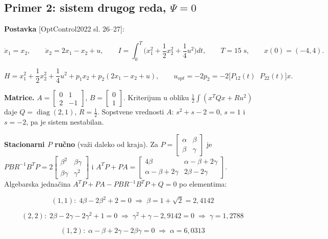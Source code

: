 \documentclass[11pt,a4paper,parskip=half,headsepline,numbers=noenddot]{scrartcl}
\DeclareRobustCommand{\izvor}[1]{{\small\color{izvorC}[#1]}}
\begin{document}
\subsection{\texorpdfstring{Primer 2: sistem drugog reda, \(\Psi = 0\)}{Primer 2: sistem drugog reda, \textbackslash Psi = 0}}

\textbf{Postavka} \izvor{OptControl2022 sl. 26--27}:

\[\dot x_1 = x_2, \qquad \dot x_2 = 2x_1 - x_2 + u, \qquad I = \int_0^T\Big(x_1^2 + \frac12x_2^2 + \frac14u^2\Big)dt, \qquad T = 15 \text{ s}, \qquad x(0) = (-4, 4) .\]

\[H = x_1^2 + \frac12x_2^2 + \frac14u^2 + p_1x_2 + p_2(2x_1 - x_2 + u), \qquad u_{opt} = -2p_2 = -2\big[P_{12}(t)\;\; P_{22}(t)\big]x .\]

\textbf{Matrice.} \(A = \begin{bmatrix} 0 & 1 \\ 2 & -1\end{bmatrix}\), \(B = \begin{bmatrix} 0 \\ 1\end{bmatrix}\). Kriterijum u obliku \(\frac12\int(x^TQx + Ru^2)\) daje \(Q = \operatorname{diag}(2, 1)\), \(R = \frac12\). Sopstvene vrednosti \(A\): \(s^2 + s - 2 = 0\), \(s = 1\) i \(s = -2\), pa je sistem nestabilan.

\textbf{Stacionarni \(P\) ručno} (važi daleko od kraja). Za \(P = \begin{bmatrix} \alpha & \beta \\ \beta & \gamma\end{bmatrix}\) je \(PBR^{-1}B^TP = 2\begin{bmatrix} \beta^2 & \beta\gamma \\ \beta\gamma & \gamma^2\end{bmatrix}\) i \(A^TP + PA = \begin{bmatrix} 4\beta & \alpha - \beta + 2\gamma \\ \alpha - \beta + 2\gamma & 2\beta - 2\gamma\end{bmatrix}\). Algebarska jednačina \(A^TP + PA - PBR^{-1}B^TP + Q = 0\) po elementima:

\[(1,1):\; 4\beta - 2\beta^2 + 2 = 0 \;\Rightarrow\; \beta = 1 + \sqrt2 = 2{,}4142\]

\[(2,2):\; 2\beta - 2\gamma - 2\gamma^2 + 1 = 0 \;\Rightarrow\; \gamma^2 + \gamma - 2{,}9142 = 0 \;\Rightarrow\; \gamma = 1{,}2788\]

\[(1,2):\; \alpha - \beta + 2\gamma - 2\beta\gamma = 0 \;\Rightarrow\; \alpha = 6{,}0313\]
\end{document}
